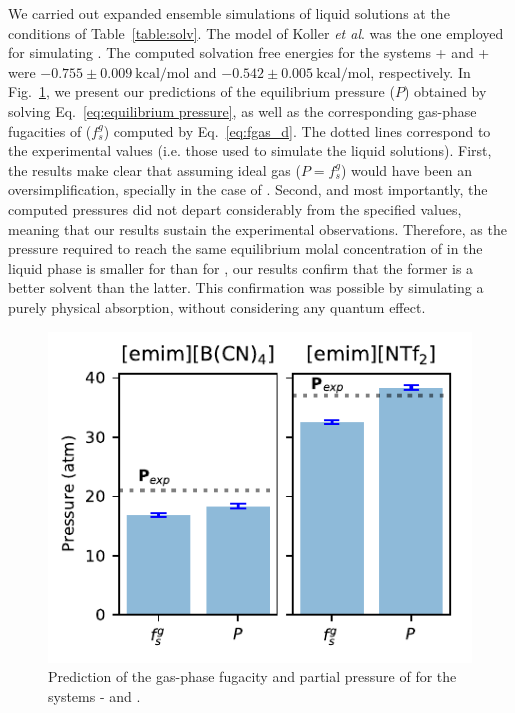 \documentclass[3p,twocolumn]{elsarticle}
\begin{document}
We carried out expanded ensemble simulations of liquid solutions at the conditions of Table~\ref{table:solv}.
The model of Koller \textit{et al}. \cite{Koller_2012} was the one employed for simulating \ce{[emim][B(CN)_4]}.
The computed solvation free energies for the systems +\ce{[emim][B(CN)_4]} and +\ce{[emim][NTf_2]} were $-0.755 \pm 0.009 ~\mathrm{kcal/mol}$ and $-0.542 \pm 0.005~\mathrm{kcal/mol}$, respectively.
In Fig.~\ref{fig:pressure}, we present our predictions of the equilibrium pressure ($P$) obtained by solving Eq.~\eqref{eq:equilibrium pressure}, as well as the corresponding gas-phase fugacities of  ($f_s^g$) computed by Eq.~\eqref{eq:fgas_d}.
The dotted lines correspond to the experimental values (i.e. those used to simulate the liquid solutions).
First, the results make clear that assuming ideal gas ($P = f_s^g$) would have been an oversimplification, specially in the case of \ce{[emim][NTf_2]}.
Second, and most importantly, the computed pressures did not depart considerably from the specified values, meaning that our results sustain the experimental observations.
Therefore, as the pressure required to reach the same equilibrium molal concentration of  in the liquid phase is smaller for \ce{[emim][B(CN)_4]} than for \ce{[emim][NTf_2]}, our results confirm that the former is a better solvent than the latter.
This confirmation was possible by simulating a purely physical absorption, without considering any quantum effect.

\begin{figure}
\includegraphics[width=\linewidth]{pressure_est.pdf}
\caption{Prediction of the gas-phase fugacity and partial pressure of  for the systems -\ce{[emim][B(CN)_4]} and \ce{[emim][NTf_2]}.}
\label{fig:pressure}
\end{figure}
\end{document}
